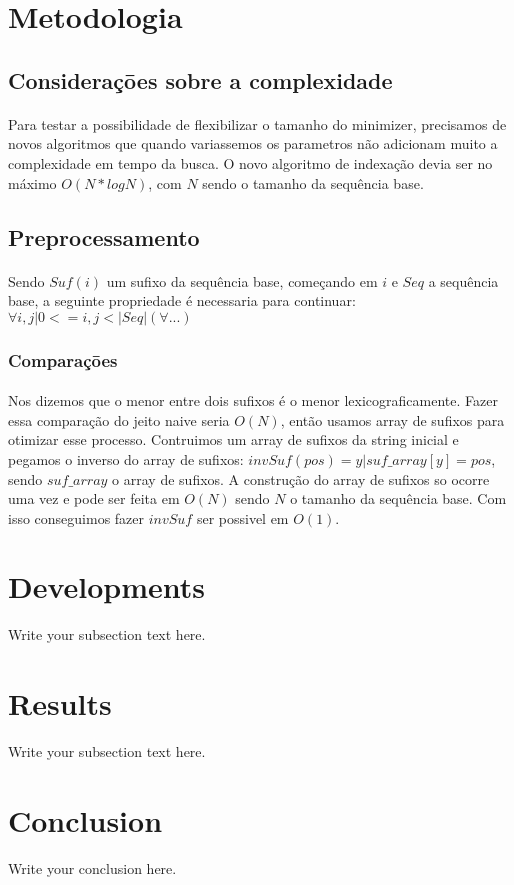 \documentclass{article}
\begin{document}
\section{Metodologia}
\subsection{Consideraçōes sobre a complexidade}
\paragraph{}{Para testar a possibilidade de flexibilizar o tamanho do minimizer, precisamos de novos algoritmos que quando variassemos os parametros não adicionam muito a complexidade em tempo da busca. O novo algoritmo de indexação devia ser no máximo \(O(N * logN)\), com \(N\) sendo o tamanho da sequência base.} 
\subsection{Preprocessamento}
\paragraph{}{Sendo \(Suf(i)\) um sufixo da sequência base, começando em \(i\) e \(Seq\) a sequência base, a seguinte propriedade é necessaria para continuar: \(\forall{i, j} | 0 <= i, j < |Seq| (\forall...) \)}
\subsubsection{Comparaçōes}
\paragraph{}{Nos dizemos que o menor entre dois sufixos é o menor lexicograficamente. Fazer essa comparação do jeito naive seria \(O(N)\), então usamos array de sufixos para otimizar esse processo. Contruimos um array de sufixos da string inicial e pegamos o inverso do array de sufixos: \(invSuf(pos) = y | suf\_array[y] = pos\), sendo \(suf\_array\) o array de sufixos. A construção do array de sufixos so ocorre uma vez e pode ser feita em \(O(N)\) sendo \(N\) o tamanho da sequência base. Com isso conseguimos fazer \(invSuf\) ser possivel em \(O(1)\).} 
\section{Developments}
Write your subsection text here.

\section{Results}
Write your subsection text here.

\section{Conclusion}
Write your conclusion here.
\end{document}
